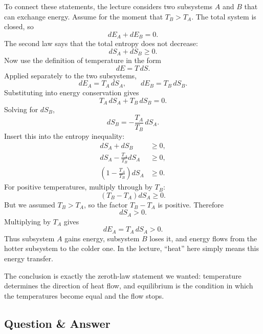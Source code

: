 To connect these statements, the lecture considers two subsystems \(A\) and \(B\) that can exchange energy. Assume for the moment that \(T_B>T_A\). The total system is closed, so
\begin{equation}
dE_A+dE_B=0.
\end{equation}
The second law says that the total entropy does not decrease:
\begin{equation}
dS_A+dS_B\ge 0.
\end{equation}
Now use the definition of temperature in the form
\begin{equation}
dE=T\,dS.
\end{equation}
Applied separately to the two subsystems,
\begin{equation}
dE_A=T_A\,dS_A,
\qquad
dE_B=T_B\,dS_B.
\end{equation}
Substituting into energy conservation gives
\begin{equation}
T_A\,dS_A+T_B\,dS_B=0.
\end{equation}
Solving for \(dS_B\),
\begin{equation}
dS_B=-\frac{T_A}{T_B}\,dS_A.
\end{equation}
Insert this into the entropy inequality:
\begin{align}
dS_A+dS_B &\ge 0, \\
dS_A-\frac{T_A}{T_B}dS_A &\ge 0, \\
\left(1-\frac{T_A}{T_B}\right)dS_A &\ge 0.
\end{align}
For positive temperatures, multiply through by \(T_B\):
\begin{equation}
(T_B-T_A)dS_A \ge 0.
\end{equation}
But we assumed \(T_B>T_A\), so the factor \(T_B-T_A\) is positive. Therefore
\begin{equation}
dS_A>0.
\end{equation}
Multiplying by \(T_A\) gives
\begin{equation}
dE_A=T_A\,dS_A>0.
\end{equation}
Thus subsystem \(A\) gains energy, subsystem \(B\) loses it, and energy flows from the hotter subsystem to the colder one. In the lecture, ``heat'' here simply means this energy transfer.

The conclusion is exactly the zeroth-law statement we wanted: temperature determines the direction of heat flow, and equilibrium is the condition in which the temperatures become equal and the flow stops.

\subsection{Question \& Answer}


